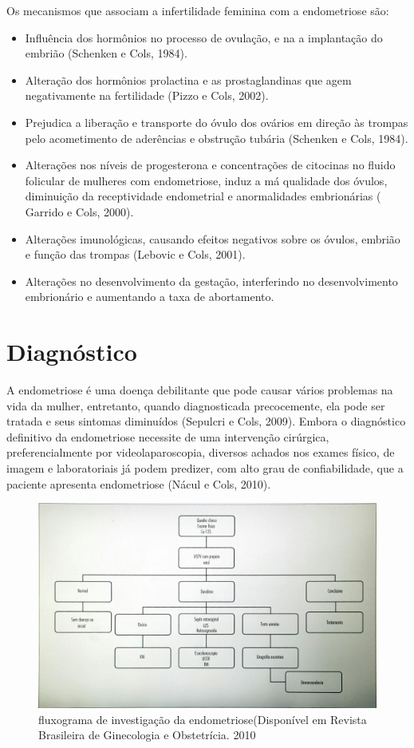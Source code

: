 \documentclass[12pt]{article} %
\begin{document}
Os mecanismos que associam a infertilidade feminina com a endometriose são:

\begin{itemize}
\item Influência dos hormônios no processo de ovulação, e na a implantação do embrião (Schenken e Cols, 1984).
\item Alteração dos hormônios prolactina e as prostaglandinas que agem negativamente na fertilidade (Pizzo e Cols, 2002).
\item Prejudica a liberação e transporte do óvulo dos ovários em direção às trompas pelo acometimento de aderências e obstrução tubária (Schenken e Cols, 1984).
\item Alterações nos níveis de progesterona e concentrações de citocinas no fluido folicular de mulheres com endometriose, induz a má qualidade dos óvulos, diminuição da receptividade endometrial e anormalidades embrionárias ( Garrido e Cols, 2000).
\item Alterações imunológicas, causando efeitos negativos sobre os óvulos, embrião e função das trompas (Lebovic e Cols, 2001).
\item Alterações no desenvolvimento da gestação, interferindo no desenvolvimento embrionário e aumentando a taxa de abortamento.
\end{itemize}


\section{Diagnóstico}


A endometriose é uma doença debilitante que pode causar vários
problemas na vida da mulher, entretanto, quando diagnosticada
precocemente, ela pode ser tratada e seus sintomas diminuídos (Sepulcri e Cols, 2009).  Embora
o diagnóstico definitivo da endometriose necessite de uma intervenção
cirúrgica, preferencialmente por videolaparoscopia, diversos achados
nos exames físico, de imagem e laboratoriais já podem predizer, com
alto grau de confiabilidade, que a paciente apresenta endometriose (Nácul e Cols, 2010).

\begin{figure}[h!]
\centering
\includegraphics[width=14cm]{tabela.png}
\caption[fluxograma de investigação da endometriose]{fluxograma de investigação da endometriose(Disponível em Revista Brasileira de Ginecologia e Obstetrícia. 2010}
\label{ fluxograma de investigação da endometriose}
\end{figure}
\end{document}
